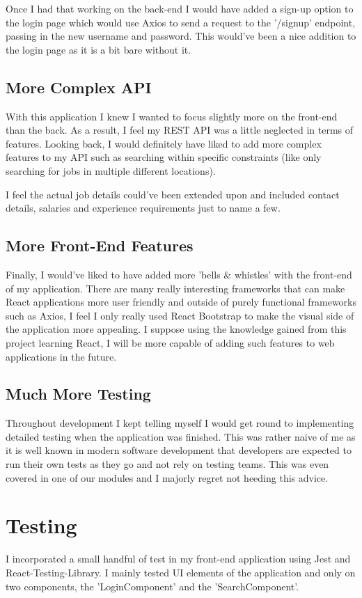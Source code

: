 Once I had that working on the back-end I would have added a sign-up option to the login page which would use Axios to send a request to the '/signup' endpoint, passing in the new username and password. This would've been a nice addition to the login page as it is a bit bare without it.

\subsection{More Complex API}
With this application I knew I wanted to focus slightly more on the front-end than the back. As a result, I feel my REST API was a little neglected in terms of features. Looking back, I would definitely have liked to add more complex features to my API such as searching within specific constraints (like only searching for jobs in multiple different locations).

I feel the actual job details could've been extended upon and included contact details, salaries and experience requirements just to name a few.

\subsection{More Front-End Features}
Finally, I would've liked to have added more 'bells \& whistles' with the front-end of my application. There are many really interesting frameworks that can make React applications more user friendly and outside of purely functional frameworks such as Axios, I feel I only really used React Bootstrap to make the visual side of the application more appealing. I suppose using the knowledge gained from this project learning React, I will be more capable of adding such features to web applications in the future.

\subsection{Much More Testing}
Throughout development I kept telling myself I would get round to implementing detailed testing when the application was finished. This was rather naive of me as it is well known in modern software development that developers are expected to run their own tests as they go and not rely on testing teams. This was even covered in one of our modules and I majorly regret not heeding this advice.

\section{Testing}
I incorporated a small handful of test in my front-end application using Jest and React-Testing-Library. I mainly tested UI elements of the application and only on two components, the 'LoginComponent' and the 'SearchComponent'.

